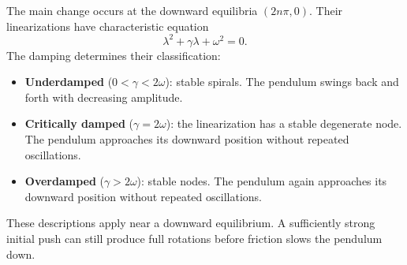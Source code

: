 \documentclass[11pt,letterpaper]{article}
\begin{document}
The main change occurs at the downward equilibria
$(2n\pi,0)$. Their linearizations have characteristic
equation
\[
\lambda^2+\gamma\lambda+\omega^2=0.
\]
The damping determines their classification:
\begin{itemize}
    \item \textbf{Underdamped} ($0<\gamma<2\omega$):
    stable spirals. The pendulum swings back and
    forth with decreasing amplitude.

    \item \textbf{Critically damped} ($\gamma=2\omega$):
    the linearization has a stable degenerate node.
    The pendulum approaches its downward position
    without repeated oscillations.

    \item \textbf{Overdamped} ($\gamma>2\omega$):
    stable nodes. The pendulum again approaches
    its downward position without repeated oscillations.
\end{itemize}

These descriptions apply near a downward equilibrium.
A sufficiently strong initial push can still produce
full rotations before friction slows the pendulum down.

\end{document}
